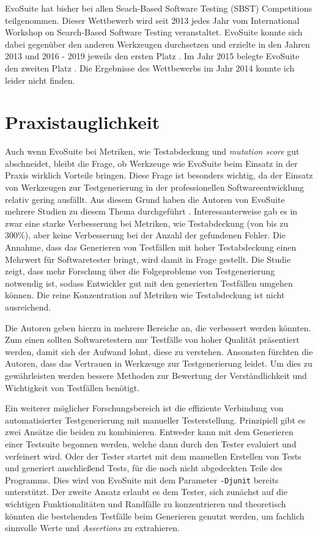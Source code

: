 \documentclass[a4paper,11pt]{article}
\begin{document}
EvoSuite hat bisher bei allen Seach-Based Software Testing (SBST) Competitions teilgenommen.
Dieser Wettbewerb wird seit 2013 jedes Jahr vom International Workshop on Search-Based Software Testing veranstaltet.
EvoSuite konnte sich dabei gegenüber den anderen Werkzeugen durchsetzen und erzielte in den Jahren 2013 und 2016 - 2019 jeweils den ersten Platz \cite{6571663, 7810701, 7967958, 8452806, 8812209}.
Im Jahr 2015 belegte EvoSuite den zweiten Platz \cite{7173585}.
Die Ergebnisse des Wettbewerbs im Jahr 2014 konnte ich leider nicht finden.

\section{Praxistauglichkeit}
\label{sec:praxistauglichkeit}

Auch wenn EvoSuite bei Metriken, wie Testabdeckung und \textit{mutation score} gut abschneidet, bleibt die Frage, ob Werkzeuge wie EvoSuite beim Einsatz in der Praxis wirklich Vorteile bringen.
Diese Frage ist besonders wichtig, da der Einsatz von Werkzeugen zur Testgenerierung in der professionellen Softwareentwicklung relativ gering ausfällt.
Aus diesem Grund haben die Autoren von EvoSuite mehrere Studien zu diesem Thema durchgeführt \cite{ISSTA13_Study, ISSTA15_Study, TOSEM_userstudy}.
Interessanterweise gab es in \cite{TOSEM_userstudy} zwar eine starke Verbesserung bei Metriken, wie Testabdeckung (von bis zu 300\%), aber keine Verbesserung bei der Anzahl der gefundenen Fehler.
Die Annahme, dass das Generieren von Testfällen mit hoher Testabdeckung einen Mehrwert für Softwaretester bringt, wird damit in Frage gestellt.
Die Studie zeigt, dass mehr Forschung über die Folgeprobleme von Testgenerierung notwendig ist, sodass Entwickler gut mit den generierten Testfällen umgehen können.
Die reine Konzentration auf Metriken wie Testabdeckung ist nicht ausreichend.

Die Autoren geben hierzu in \cite{TOSEM_userstudy} mehrere Bereiche an, die verbessert werden könnten.
Zum einen sollten Softwaretestern nur Testfälle von hoher Qualität präsentiert werden, damit sich der Aufwand lohnt, diese zu verstehen.
Ansonsten fürchten die Autoren, dass das Vertrauen in Werkzeuge zur Testgenerierung leidet.
Um dies zu gewährleisten werden bessere Methoden zur Bewertung der Verständlichkeit und Wichtigkeit von Testfällen benötigt.

Ein weiterer möglicher Forschungsbereich ist die effiziente Verbindung von automatisierter Testgenerierung mit manueller Testerstellung.
Prinzipiell gibt es zwei Ansätze die beiden zu kombinieren.
Entweder kann mit dem Generieren einer Testsuite begonnen werden, welche dann durch den Tester evaluiert und verfeinert wird.
Oder der Tester startet mit dem manuellen Erstellen von Tests und generiert anschließend Tests, für die noch nicht abgedeckten Teile des Programms.
Dies wird von EvoSuite mit dem Parameter \texttt{-Djunit} bereits unterstützt.
Der zweite Ansatz erlaubt es dem Tester, sich zunächst auf die wichtigen Funktionalitäten und Randfälle zu konzentrieren und theoretisch könnten die bestehenden Testfälle beim Generieren genutzt werden, um fachlich sinnvolle Werte und \textit{Assertions} zu extrahieren.
\end{document}
